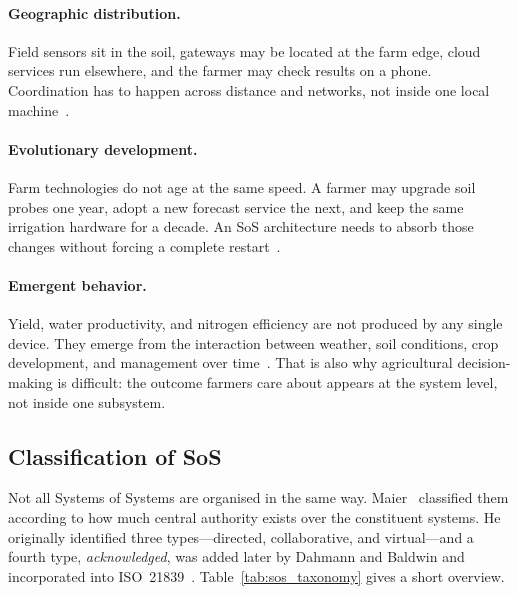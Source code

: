 \paragraph{Geographic distribution.}
Field sensors sit in the soil, gateways may be located at the farm edge, cloud
services run elsewhere, and the farmer may check results on a phone. Coordination
has to happen across distance and networks, not inside one local
machine~\cite{nielsen2015sos}.

\paragraph{Evolutionary development.}
Farm technologies do not age at the same speed. A farmer may upgrade soil probes
one year, adopt a new forecast service the next, and keep the same irrigation
hardware for a decade. An SoS architecture needs to absorb those changes without
forcing a complete restart~\cite{nielsen2015sos, madni2014integration}.

\paragraph{Emergent behavior.}
Yield, water productivity, and nitrogen efficiency are not produced by any single
device. They emerge from the interaction between weather, soil conditions, crop
development, and management over time~\cite{jamshidi2008systems, boote2019cropmodelling}.
That is also why agricultural decision-making is difficult: the outcome farmers
care about appears at the system level, not inside one subsystem.


\subsection{Classification of SoS}
\label{subsec:sos_classification}

Not all Systems of Systems are organised in the same way. Maier~\cite{maier1998architecting}
classified them according to how much central authority exists over the
constituent systems. He originally identified three types---directed,
collaborative, and virtual---and a fourth type, \emph{acknowledged}, was added
later by Dahmann and Baldwin and incorporated into ISO~21839~\cite{nielsen2015sos}.
Table~\ref{tab:sos_taxonomy} gives a short overview.

